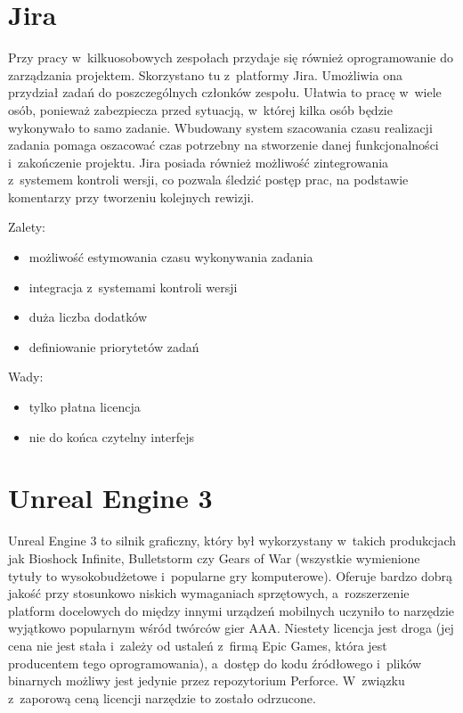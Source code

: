 \section{Jira}

Przy pracy w~kilkuosobowych zespołach przydaje się również oprogramowanie do zarządzania projektem. Skorzystano tu z~platformy Jira. Umożliwia ona przydział zadań do poszczególnych członków zespołu. Ułatwia to pracę w~wiele osób, ponieważ zabezpiecza przed sytuacją, w~której kilka osób będzie wykonywało to samo zadanie. Wbudowany system szacowania czasu realizacji zadania pomaga oszacować czas potrzebny na stworzenie danej funkcjonalności i~zakończenie projektu. Jira posiada również możliwość zintegrowania z~systemem kontroli wersji, co pozwala śledzić postęp prac, na podstawie komentarzy przy tworzeniu kolejnych rewizji.

{\raggedright Zalety:
\begin{itemize}
\item możliwość estymowania czasu wykonywania zadania
\item integracja z~systemami kontroli wersji
\item duża liczba dodatków
\item definiowanie priorytetów zadań
\end{itemize}

Wady:
\begin{itemize}
\item tylko płatna licencja
\item nie do końca czytelny interfejs
\end{itemize}
}

\section{Unreal Engine 3}

Unreal Engine 3 to silnik graficzny, który był wykorzystany w~takich produkcjach jak Bioshock Infinite, Bulletstorm czy Gears of War (wszystkie wymienione tytuły to wysokobudżetowe i~popularne gry komputerowe). Oferuje bardzo dobrą jakość przy stosunkowo niskich wymaganiach sprzętowych, a~rozszerzenie platform docelowych do między innymi urządzeń mobilnych uczyniło to narzędzie wyjątkowo popularnym wśród twórców gier AAA. Niestety licencja jest droga (jej cena nie jest stała i~zależy od ustaleń z~firmą Epic Games, która jest producentem tego oprogramowania), a~dostęp do kodu źródłowego i~plików binarnych możliwy jest jedynie przez repozytorium Perforce. W~związku z~zaporową ceną licencji narzędzie to zostało odrzucone.\\

